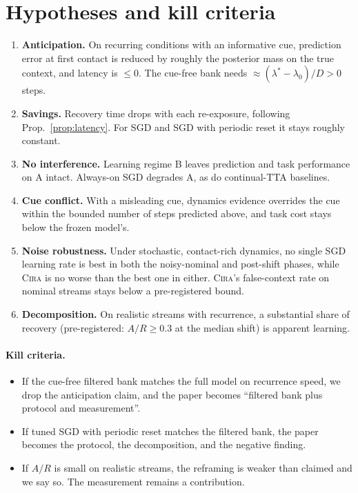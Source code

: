 \documentclass[10pt]{article}
\newcommand{\method}{\textsc{Cira}}
\begin{document}
\section{Hypotheses and kill criteria}

\begin{enumerate}[label=\textbf{H\arabic*},leftmargin=2.2em]
  \item \textbf{Anticipation.} On recurring conditions with an informative cue, prediction error at
  first contact is reduced by roughly the posterior mass on the true context, and latency is $\le 0$.
  The cue-free bank needs $\approx(\lambda^\ast-\lambda_0)/D>0$ steps.
  \item \textbf{Savings.} Recovery time drops with each re-exposure, following
  Prop.~\ref{prop:latency}. For SGD and SGD with periodic reset it stays roughly constant.
  \item \textbf{No interference.} Learning regime B leaves prediction and task performance on A
  intact. Always-on SGD degrades A, as do continual-TTA baselines.
  \item \textbf{Cue conflict.} With a misleading cue, dynamics evidence overrides the cue within the
  bounded number of steps predicted above, and task cost stays below the frozen model's.
  \item \textbf{Noise robustness.} Under stochastic, contact-rich dynamics, no single SGD learning rate
  is best in both the noisy-nominal and post-shift phases, while \method{} is no worse than the best
  one in either. \method{}'s false-context rate on nominal streams stays below a pre-registered bound.
  \item \textbf{Decomposition.} On realistic streams with recurrence, a substantial share of recovery
  (pre-registered: $A/R\ge 0.3$ at the median shift) is apparent learning.
\end{enumerate}

\paragraph{Kill criteria.}
\begin{itemize}
  \item If the cue-free filtered bank matches the full model on recurrence speed, we drop the
  anticipation claim, and the paper becomes ``filtered bank plus protocol and measurement''.
  \item If tuned SGD with periodic reset matches the filtered bank, the paper becomes the protocol, the
  decomposition, and the negative finding.
  \item If $A/R$ is small on realistic streams, the reframing is weaker than claimed and we say so. The
  measurement remains a contribution.
\end{itemize}
\end{document}
